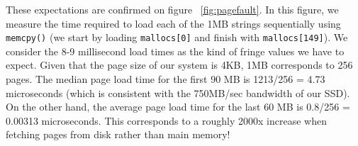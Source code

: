 These expectations are confirmed on figure ~\ref{fig:pagefault}. In this figure, we measure the time required to load each of the 1MB strings sequentially using \texttt{memcpy()} (we start by loading \texttt{mallocs[0]} and finish with \texttt{mallocs[149]}). We consider the 8-9 millisecond load times as the kind of fringe values we have to expect.
Given that the page size of our system is 4KB, 1MB corresponds to 256 pages. The median page load time for the first 90 MB is 1213/256 = 4.73  microseconds (which is consistent with the 750MB/sec bandwidth of our SSD). On the other hand, the average page load time for the last 60 MB is 0.8/256 = 0.00313  microseconds. This corresponds to a roughly 2000x increase when fetching pages from disk rather than main memory!

